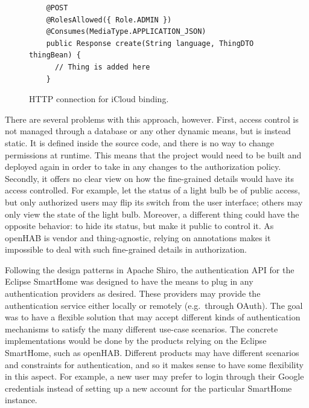 \documentclass[12pt]{article}
\begin{document}
\begin{figure} [htb]
\begin{lstlisting}
    @POST
    @RolesAllowed({ Role.ADMIN })
    @Consumes(MediaType.APPLICATION_JSON)
    public Response create(String language, ThingDTO thingBean) {
      // Thing is added here
    }
\end{lstlisting}
\caption{HTTP connection for iCloud binding.}
\label{lst:jaas_roles}
\end{figure}

There are several problems with this approach, however. First, access control is not managed through a database or any other dynamic means, but is instead static. It is defined inside the source code, and there is no way to change permissions at runtime. This means that the project would need to be built and deployed again in order to take in any changes to the authorization policy. Secondly, it offers no clear view on how the fine-grained details would have its access controlled. For example, let the status of a light bulb be of public access, but only authorized users may flip its switch from the user interface; others may only view the state of the light bulb. Moreover, a different thing could have the opposite behavior: to hide its status, but make it public to control it. As openHAB is vendor and thing-agnostic, relying on annotations makes it impossible to deal with such fine-grained details in authorization.

Following the design patterns in Apache Shiro, the authentication API for the Eclipse SmartHome was designed to have the means to plug in any authentication providers as desired. These providers may provide the authentication service either locally or remotely (e.g.\ through OAuth). The goal was to have a flexible solution that may accept different kinds of authentication mechanisms to satisfy the many different use-case scenarios. The concrete implementations would be done by the products relying on the Eclipse SmartHome, such as openHAB. Different products may have different scenarios and constraints for authentication, and so it makes sense to have some flexibility in this aspect. For example, a new user may prefer to login through their Google credentials instead of setting up a new account for the particular SmartHome instance. 
\end{document}
